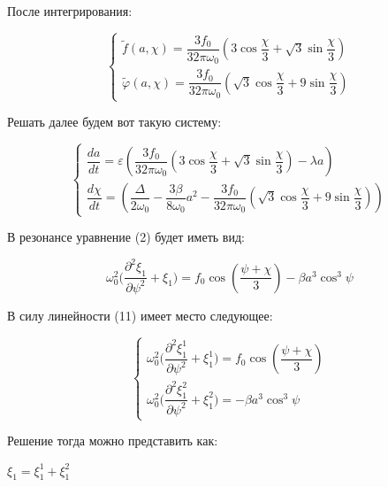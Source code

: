 \documentclass[a4paper, 12pt]{article}
\begin{document}
	\quad После интегрирования: 
	
	\begin{equation}
		\begin{cases}
			\tilde{f}(a, \chi) = \dfrac{3f_0}{32\pi \omega_0} \left(3\cos{\dfrac{\chi}{3}} + \sqrt{3} \sin{\dfrac{\chi}{3}}\right)\\
			\tilde{\varphi} (a, \chi) =  \dfrac{3f_0}{32\pi \omega_0} \left(\sqrt{3}\cos{\dfrac{\chi}{3}} + 9 \sin{\dfrac{\chi}{3}}\right)
		\end{cases}
	\end{equation}
	
	\quad Решать далее будем вот такую систему: 
	
	\begin{equation}
		\begin{cases}
			\dfrac{da}{dt} = \varepsilon \left(  \dfrac{3f_0}{32\pi \omega_0} \left(3\cos{\dfrac{\chi}{3}} + \sqrt{3} \sin{\dfrac{\chi}{3}}\right) - \lambda a\right) \\ 
			\dfrac{d\chi}{dt} = \left(\dfrac{\Delta }{2\omega_0} - \dfrac{3\beta}{8\omega_0} a^2 - \dfrac{3f_0}{32\pi \omega_0} \left(\sqrt{3}\cos{\dfrac{\chi}{3}} + 9 \sin{\dfrac{\chi}{3}}\right)\right)
		\end{cases}
	\end{equation}
	
	\quad В резонансе уравнение (2) будет иметь вид: 
	
	\begin{equation}
		\omega_0^2 \bigg(\dfrac{\partial^2 \xi_1 }{\partial\psi^2} + \xi_1 \bigg) = f_0\cos\left(\dfrac{\psi + \chi}{3}\right)- \beta a^3 \cos^3\psi  
	\end{equation}
	
	\quad В силу линейности (11) имеет место следующее: 
	
	\begin{equation}
		\begin{cases}
			\omega_0^2 \bigg(\dfrac{\partial^2 \xi_1^1 }{\partial\psi^2} + \xi_1^1 \bigg) = f_0\cos\left(\dfrac{\psi + \chi}{3}\right) \\
			\omega_0^2 \bigg(\dfrac{\partial^2 \xi_1^2 }{\partial\psi^2} + \xi_1^2 \bigg) =- \beta a^3 \cos^3\psi  
		\end{cases}
	\end{equation}
	
	\quad Решение тогда можно представить как: 
	
	\begin{center}
		$\xi_1 = \xi_1^1 + \xi_1^2 $
	\end{center}
	
\end{document}

